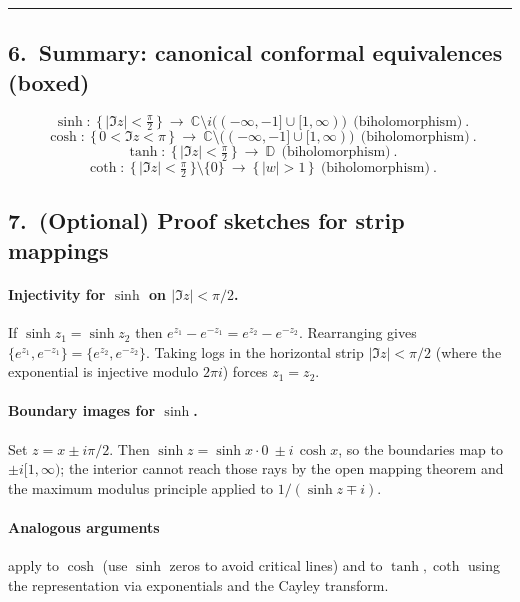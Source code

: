 \documentclass[11pt]{article}
\begin{document}
\bigskip\hrule\bigskip

\subsection*{6.\ Summary: canonical conformal equivalences (boxed)}
\[
\boxed{\
	\sinh:\ \{\,|\Im z|<\tfrac{\pi}{2}\,\}\ \longrightarrow\ 
	\mathbb C\setminus i\big((-\infty,-1]\cup[1,\infty)\big)\ \ \text{(biholomorphism)}\ .
}
\]
\[
\boxed{\
	\cosh:\ \{\,0<\Im z<\pi\,\}\ \longrightarrow\ 
	\mathbb C\setminus\big((-\infty,-1]\cup[1,\infty)\big)\ \ \text{(biholomorphism)}\ .
}
\]
\[
\boxed{\
	\tanh:\ \{\,|\Im z|<\tfrac{\pi}{2}\,\}\ \longrightarrow\ \mathbb D\ \ \text{(biholomorphism)}\ .
}
\]
\[
\boxed{\
	\coth:\ \{\,|\Im z|<\tfrac{\pi}{2}\,\}\setminus\{0\}\ \longrightarrow\ \{\,|w|>1\,\}\ \ \text{(biholomorphism)}\ .
}
\]

\medskip

\subsection*{7.\ (Optional) Proof sketches for strip mappings}

\paragraph{Injectivity for $\sinh$ on $|\Im z|<\pi/2$.}
If $\sinh z_{1}=\sinh z_{2}$ then $e^{z_{1}}-e^{-z_{1}}=e^{z_{2}}-e^{-z_{2}}$.
Rearranging gives $\{e^{z_{1}},e^{-z_{1}}\}=\{e^{z_{2}},e^{-z_{2}}\}$.
Taking logs in the horizontal strip $|\Im z|<\pi/2$ (where the exponential is injective modulo $2\pi i$) forces $z_{1}=z_{2}$.

\paragraph{Boundary images for $\sinh$.}
Set $z=x\pm i\pi/2$. Then $\sinh z=\sinh x\cdot 0 \ \pm i\,\cosh x$, so the boundaries map to $\pm i[1,\infty)$; the interior cannot reach those rays by the open mapping theorem and the maximum modulus principle applied to $1/(\sinh z\mp i)$.

\paragraph{Analogous arguments} apply to $\cosh$ (use $\sinh$ zeros to avoid critical lines) and to $\tanh,\coth$ using the representation via exponentials and the Cayley transform.
\end{document}

